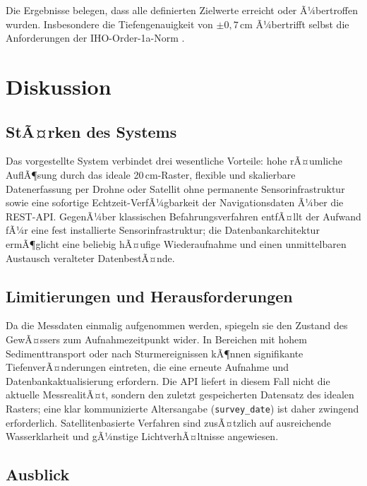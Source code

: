 ﻿\documentclass[a4paper,12pt]{article}
\theoremstyle{definition}
\begin{document}
\noindent
Die Ergebnisse belegen, dass alle definierten Zielwerte erreicht oder Ã¼bertroffen wurden.
Insbesondere die Tiefengenauigkeit von $\pm 0{,}7\,\text{cm}$ Ã¼bertrifft selbst die
Anforderungen der IHO-Order-1a-Norm \cite{iho2020}.

\section{Diskussion}

\subsection{StÃ¤rken des Systems}

Das vorgestellte System verbindet drei wesentliche Vorteile: hohe rÃ¤umliche AuflÃ¶sung
durch das ideale 20\,cm-Raster, flexible und skalierbare Datenerfassung per Drohne oder
Satellit ohne permanente Sensorinfrastruktur sowie eine sofortige Echtzeit-VerfÃ¼gbarkeit
der Navigationsdaten Ã¼ber die REST-API. GegenÃ¼ber klassischen Befahrungsverfahren
entfÃ¤llt der Aufwand fÃ¼r eine fest installierte Sensor\-infrastruktur; die Datenbankarchitektur
ermÃ¶glicht eine beliebig hÃ¤ufige Wiederaufnahme und einen unmittelbaren Austausch
veralteter DatenbestÃ¤nde.

\subsection{Limitierungen und Herausforderungen}

Da die Messdaten einmalig aufgenommen werden, spiegeln sie den Zustand des GewÃ¤ssers
zum Aufnahmezeitpunkt wider. In Bereichen mit hohem Sedimenttransport oder nach
Sturmereignissen kÃ¶nnen signifikante TiefenverÃ¤nderungen eintreten, die eine erneute
Aufnahme und Datenbankaktualisierung erfordern. Die API liefert in diesem Fall nicht
die aktuelle MessrealitÃ¤t, sondern den zuletzt gespeicherten Datensatz des idealen
Rasters; eine klar kommunizierte Altersangabe (\texttt{survey\_date}) ist daher
zwingend erforderlich. Satellitenbasierte Verfahren sind zusÃ¤tzlich auf ausreichende
Wasserklarheit und gÃ¼nstige LichtverhÃ¤ltnisse angewiesen.

\subsection{Ausblick}
\end{document}
